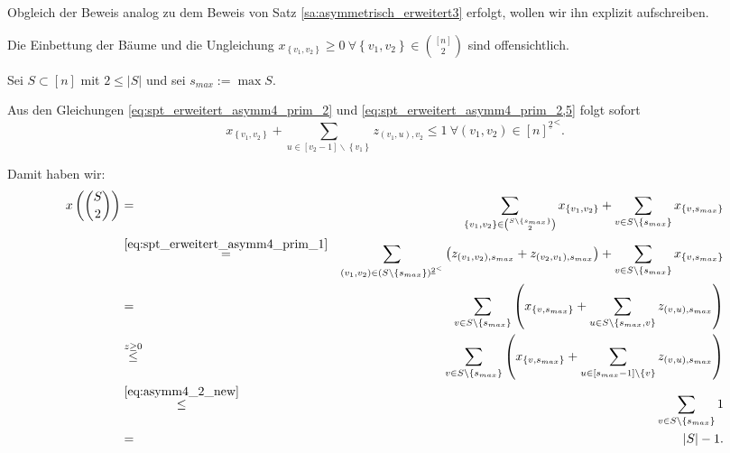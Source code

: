 \documentclass[10p,a4paper,BCOR = 12mm, DIV=15]{scrbook}
\begin{document}
\begin{bew}
Obgleich der Beweis analog zu dem Beweis von Satz \ref{sa:asymmetrisch_erweitert3} erfolgt, wollen wir ihn explizit aufschreiben.

Die Einbettung der Bäume und die Ungleichung $x_{\left\{v_1, v_2\right\}} \geq 0 \ \forall \left\{v_1, v_2\right\} \in {\left[n\right] \choose 2}$ sind offensichtlich.

Sei $S \subset \left[n\right]$ mit $2 \leq \left|S\right|$ und sei $s_{max} := \max S$.

Aus den Gleichungen \eqref{eq:spt_erweitert_asymm4_prim_2} und \eqref{eq:spt_erweitert_asymm4_prim_2,5} folgt sofort
\begin{equation}
x_{\left\{v_1, v_2\right\}} + \sum_{u\in[v_2-1]\backslash\left\{v_1\right\}} z_{\left(v_1, u\right), v_2} \leq 1\ \forall \left(v_1, v_2\right)\in {[n]^{\underline{2}}}^<. \label{eq:asymm4_2_new}
\end{equation}

Damit haben wir:
{
\allowdisplaybreaks
\begin{eqnarray*}
x\left({S \choose 2}\right) & = & \sum_{\left\{v_1, v_2\right\} \in {S \backslash \left\{s_{max}\right\} \choose 2}} x_{\left\{v_1, v_2\right\}} + \sum_{v \in S \backslash \left\{s_{max}\right\}} x_{\left\{v, s_{max}\right\}} \\
& \stackrel{\eqref{eq:spt_erweitert_asymm4_prim_1}}{=} & \sum_{\left(v_1, v_2\right) \in \left(S \backslash \left\{s_{max}\right\}\right)^{\underline{2}^<}} \left(z_{\left(v_1, v_2\right), s_{max}} + z_{\left(v_2, v_1\right), s_{max}}\right) + \sum_{v \in S \backslash \left\{s_{max}\right\}} x_{\left\{v, s_{max}\right\}} \\
& = & \sum_{v \in S \backslash \left\{s_{max}\right\}} \left(x_{\left\{v, s_{max}\right\}} + \sum_{u \in S \backslash \left\{s_{max}, v\right\}} z_{\left(v, u\right), s_{max}}\right) \\
& \stackrel{z \geq 0}{\leq} & \sum_{v \in S \backslash \left\{s_{max}\right\}} \left(x_{\left\{v, s_{max}\right\}} + \sum_{u \in \left[s_{max}-1\right] \backslash \left\{v\right\}} z_{\left(v, u\right), s_{max}}\right) \\
& \stackrel{\eqref{eq:asymm4_2_new}}{\leq} & \sum_{v \in S \backslash \left\{s_{max}\right\}} 1 \\
& = & \left|S\right| - 1.
\end{eqnarray*}
}


\end{bew}
\end{document}
